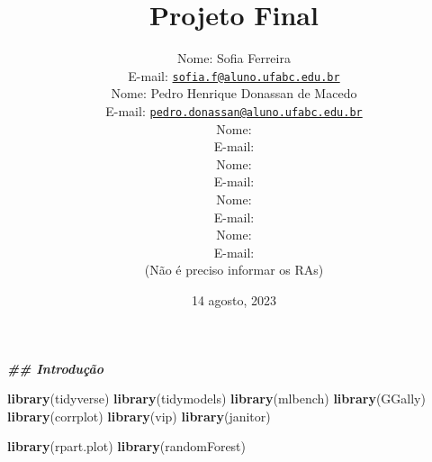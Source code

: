 \documentclass[
]{article}
\title{Projeto Final}
\author{Nome: Sofia Ferreira\\
E-mail:
\href{mailto:sofia.f@aluno.ufabc.edu.br}{\nolinkurl{sofia.f@aluno.ufabc.edu.br}}

Nome: Pedro Henrique Donassan de Macedo\\
E-mail:
\href{mailto:pedro.donassan@aluno.ufabc.edu.br}{\nolinkurl{pedro.donassan@aluno.ufabc.edu.br}}

Nome:\\
E-mail:

Nome:\\
E-mail:

Nome:\\
E-mail:

Nome:\\
E-mail:\\
(Não é preciso informar os RAs)}
\date{14 agosto, 2023}
\newenvironment{Shaded}{\begin{snugshade}}{\end{snugshade}}
\newcommand{\DocumentationTok}[1]{\textcolor[rgb]{0.56,0.35,0.01}{\textbf{\textit{#1}}}}
\newcommand{\FunctionTok}[1]{\textcolor[rgb]{0.13,0.29,0.53}{\textbf{#1}}}
\newcommand{\NormalTok}[1]{#1}
\begin{document}
\maketitle

\hypertarget{section}{%
\section{}\label{section}}

\begin{Shaded}
\begin{Highlighting}[]
\DocumentationTok{\#\# Introdução}
\end{Highlighting}
\end{Shaded}

\begin{Shaded}
\begin{Highlighting}[]
\FunctionTok{library}\NormalTok{(tidyverse)}
\FunctionTok{library}\NormalTok{(tidymodels)}
\FunctionTok{library}\NormalTok{(mlbench)}
\FunctionTok{library}\NormalTok{(GGally)}
\FunctionTok{library}\NormalTok{(corrplot)}
\FunctionTok{library}\NormalTok{(vip)}
\FunctionTok{library}\NormalTok{(janitor)}

\FunctionTok{library}\NormalTok{(rpart.plot)}
\FunctionTok{library}\NormalTok{(randomForest)}
\end{Highlighting}
\end{Shaded}
\end{document}
